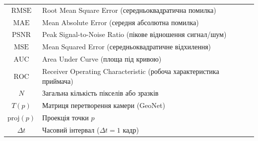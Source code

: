 \documentclass[14pt, a4paper]{extarticle}
\numberwithin{equation}{section}
\begin{document}
\begin{longtable}{|c|l|}
$\text{RMSE}$ & Root Mean Square Error (середньоквадратична помилка) \\
$\text{MAE}$ & Mean Absolute Error (середня абсолютна помилка) \\
$\text{PSNR}$ & Peak Signal-to-Noise Ratio (пікове відношення сигнал/шум) \\
$\text{MSE}$ & Mean Squared Error (середньоквадратичне відхилення) \\
$\text{AUC}$ & Area Under Curve (площа під кривою) \\
$\text{ROC}$ & Receiver Operating Characteristic (робоча характеристика приймача) \\
$N$ & Загальна кількість пікселів або зразків \\
$T(p)$ & Матриця перетворення камери (GeoNet) \\
$\text{proj}(p)$ & Проекція точки $p$ \\
$\Delta t$ & Часовий інтервал ($\Delta t = 1$ кадр) \\
\hline
\end{longtable}
\end{document}
